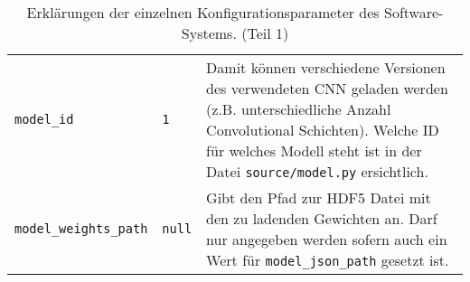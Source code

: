 \begin{table}[H]
\begin{adjustbox}{max width=\textwidth, max height=\textheight}
\begin{tabular}{llp{10cm}}
			\texttt{model{\_}id} & \texttt{1} & Damit können verschiedene Versionen des verwendeten CNN geladen werden (z.B. unterschiedliche Anzahl Convolutional Schichten). Welche ID für welches Modell steht ist in der Datei \texttt{source/model.py} ersichtlich.\\
			\texttt{model{\_}weights{\_}path} & \texttt{null} & Gibt den Pfad zur HDF5 Datei mit den zu ladenden Gewichten an. Darf nur angegeben werden sofern auch ein Wert für \texttt{model{\_}json{\_}path} gesetzt ist.\\
			\bottomrule
		\end{tabular}
	\end{adjustbox}
	\caption{Erklärungen der einzelnen Konfigurationsparameter des Software-Systems. (Teil 1)}
\end{table}

\clearpage


